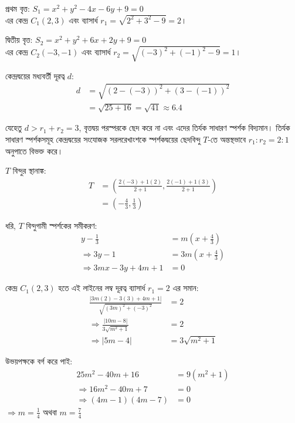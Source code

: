 \documentclass[12pt, a4paper]{article}
\begin{document}
\begin{tcolorbox}[solutionbox={সমাধান (Solution)}]
    \noindent
    প্রথম বৃত্ত: $S_1 = x^2 + y^2 - 4x - 6y + 9 = 0$ \\
    এর কেন্দ্র $C_1(2, 3)$ এবং ব্যাসার্ধ $r_1 = \sqrt{2^2 + 3^2 - 9} = 2$। 
    
    দ্বিতীয় বৃত্ত: $S_2 = x^2 + y^2 + 6x + 2y + 9 = 0$ \\
    এর কেন্দ্র $C_2(-3, -1)$ এবং ব্যাসার্ধ $r_2 = \sqrt{(-3)^2 + (-1)^2 - 9} = 1$। 
    
    কেন্দ্রদ্বয়ের মধ্যবর্তী দূরত্ব $d$:
    \begin{align*}
        d &= \sqrt{(2 - (-3))^2 + (3 - (-1))^2} \\
          &= \sqrt{25 + 16} = \sqrt{41} \approx 6.4
    \end{align*}
    
    যেহেতু $d > r_1 + r_2 = 3$, বৃত্তদ্বয় পরস্পরকে ছেদ করে না এবং এদের তির্যক সাধারণ স্পর্শক বিদ্যমান। তির্যক সাধারণ স্পর্শকসমূহ কেন্দ্রদ্বয়ের সংযোজক সরলরেখাংশকে স্পর্শকদ্বয়ের ছেদবিন্দু $T$-তে অন্তস্থভাবে $r_1 : r_2 = 2 : 1$ অনুপাতে বিভক্ত করে। 
    
    $T$ বিন্দুর স্থানাঙ্ক:
    \begin{align*}
        T &= \left(\frac{2(-3) + 1(2)}{2+1}, \frac{2(-1) + 1(3)}{2+1}\right) \\
          &= \left(-\frac{4}{3}, \frac{1}{3}\right)
    \end{align*}
    
    ধরি, $T$ বিন্দুগামী স্পর্শকের সমীকরণ:
    \begin{align*}
        y - \frac{1}{3} &= m\left(x + \frac{4}{3}\right) \\
        \Rightarrow 3y - 1 &= 3m\left(x + \frac{4}{3}\right) \\
        \Rightarrow 3mx - 3y + 4m + 1 &= 0
    \end{align*}
    
    কেন্দ্র $C_1(2, 3)$ হতে এই লাইনের লম্ব দূরত্ব ব্যাসার্ধ $r_1 = 2$ এর সমান:
    \begin{align*}
        \frac{|3m(2) - 3(3) + 4m + 1|}{\sqrt{(3m)^2 + (-3)^2}} &= 2 \\
        \Rightarrow \frac{|10m - 8|}{3\sqrt{m^2 + 1}} &= 2 \\
        \Rightarrow |5m - 4| &= 3\sqrt{m^2 + 1}
    \end{align*}
    
    উভয়পক্ষকে বর্গ করে পাই:
    \begin{align*}
        25m^2 - 40m + 16 &= 9(m^2 + 1) \\
        \Rightarrow 16m^2 - 40m + 7 &= 0 \\
        \Rightarrow (4m - 1)(4m - 7) &= 0
    \end{align*}
    $\Rightarrow m = \frac{1}{4}$ অথবা $m = \frac{7}{4}$
    

\end{tcolorbox}
\end{document}
